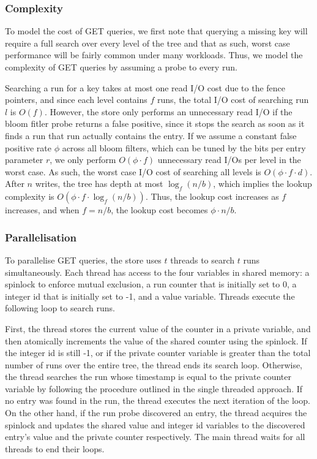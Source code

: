 \documentclass{acm}
\begin{document}
\subsubsection{Complexity}

To model the cost of GET queries, we first note that querying a missing key will require a full search over every level of the tree and that as such, worst case performance will be fairly common under many workloads. Thus, we model the complexity of GET queries by assuming a probe to every run.

Searching a run for a key takes at most one read I/O cost due to the fence pointers, and since each level contains $f$ runs, the total I/O cost of searching run $l$ is $O(f)$. However, the store only performs an unnecessary read I/O if the bloom fitler probe returns a false positive, since it stops the search as soon as it finds a run that run actually contains the entry. If we assume a constant false positive rate $\phi$ across all bloom filters, which can be tuned by the bits per entry parameter $r$, we only perform $O(\phi \cdot f)$ unnecessary read I/Os per level in the worst case. As such, the worst case I/O cost of searching all levels is $O\left(\phi \cdot f \cdot d\right)$. After $n$ writes, the tree has depth at most $\log_f(n/b)$, which implies the lookup complexity is $O(\phi \cdot f \cdot \log_f(n/b))$. Thus, the lookup cost increases as $f$ increases, and when $f=n/b$, the lookup cost becomes $\phi \cdot n/b$.

\subsubsection{Parallelisation}

To parallelise GET queries, the store uses $t$ threads to search $t$ runs simultaneously. Each thread has access to the four variables in shared memory: a spinlock to enforce mutual exclusion, a run counter that is initially set to 0, a integer id that is initially set to -1, and a value variable. Threads execute the following loop to search runs.

First, the thread stores the current value of the counter in a private variable, and then atomically increments the value of the shared counter using the spinlock. If the integer id is still -1, or if the private counter variable is greater than the total number of runs over the entire tree, the thread ends its search loop. Otherwise, the thread searches the run whose timestamp is equal to the private counter variable by following the procedure outlined in the single threaded approach. If no entry was found in the run, the thread executes the next iteration of the loop. On the other hand, if the run probe discovered an entry, the thread acquires the spinlock and updates the shared value and integer id variables to the discovered entry's value and the private counter respectively. The main thread waits for all threads to end their loops.
\end{document}
